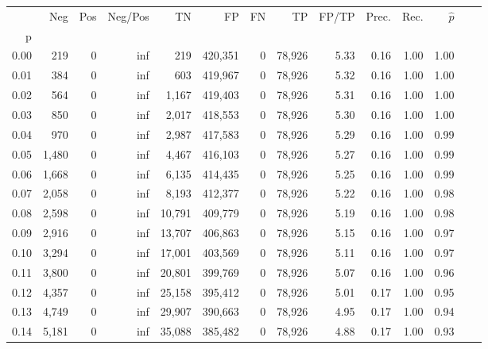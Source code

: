 \begin{tabular}{rrrrrrrrrrrrrr}
\toprule
{} &    Neg &    Pos &  Neg/Pos &       TN &       FP &      FN &      TP & FP/TP & Prec. &  Rec. & $\hat{p}$ \\
p    &        &        &          &          &          &         &         &       &       &       &           \\
\midrule
0.00 &    219 &      0 &      inf &      219 &  420,351 &       0 &  78,926 &  5.33 &  0.16 &  1.00 &      1.00 \\
0.01 &    384 &      0 &      inf &      603 &  419,967 &       0 &  78,926 &  5.32 &  0.16 &  1.00 &      1.00 \\
0.02 &    564 &      0 &      inf &    1,167 &  419,403 &       0 &  78,926 &  5.31 &  0.16 &  1.00 &      1.00 \\
0.03 &    850 &      0 &      inf &    2,017 &  418,553 &       0 &  78,926 &  5.30 &  0.16 &  1.00 &      1.00 \\
0.04 &    970 &      0 &      inf &    2,987 &  417,583 &       0 &  78,926 &  5.29 &  0.16 &  1.00 &      0.99 \\
0.05 &  1,480 &      0 &      inf &    4,467 &  416,103 &       0 &  78,926 &  5.27 &  0.16 &  1.00 &      0.99 \\
0.06 &  1,668 &      0 &      inf &    6,135 &  414,435 &       0 &  78,926 &  5.25 &  0.16 &  1.00 &      0.99 \\
0.07 &  2,058 &      0 &      inf &    8,193 &  412,377 &       0 &  78,926 &  5.22 &  0.16 &  1.00 &      0.98 \\
0.08 &  2,598 &      0 &      inf &   10,791 &  409,779 &       0 &  78,926 &  5.19 &  0.16 &  1.00 &      0.98 \\
0.09 &  2,916 &      0 &      inf &   13,707 &  406,863 &       0 &  78,926 &  5.15 &  0.16 &  1.00 &      0.97 \\
0.10 &  3,294 &      0 &      inf &   17,001 &  403,569 &       0 &  78,926 &  5.11 &  0.16 &  1.00 &      0.97 \\
0.11 &  3,800 &      0 &      inf &   20,801 &  399,769 &       0 &  78,926 &  5.07 &  0.16 &  1.00 &      0.96 \\
0.12 &  4,357 &      0 &      inf &   25,158 &  395,412 &       0 &  78,926 &  5.01 &  0.17 &  1.00 &      0.95 \\
0.13 &  4,749 &      0 &      inf &   29,907 &  390,663 &       0 &  78,926 &  4.95 &  0.17 &  1.00 &      0.94 \\
0.14 &  5,181 &      0 &      inf &   35,088 &  385,482 &       0 &  78,926 &  4.88 &  0.17 &  1.00 &      0.93 \\

\end{tabular}
